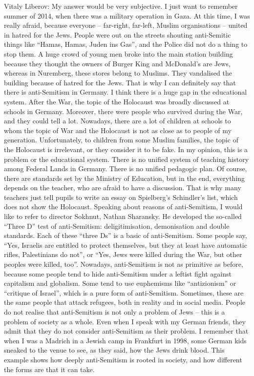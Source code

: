 Vitaly Liberov: My answer would be very subjective. I just want to remember summer of 2014, when there was a military operation in Gaza. At this time, I was really afraid, because everyone – far-right, far-left, Muslim organisations – united in hatred for the Jews. People were out on the streets shouting anti-Semitic things like “Hamas, Hamas, Juden ins Gas”, and the Police did not do a thing to stop them. A huge crowd of young men broke into the main station building because they thought the owners of Burger King and McDonald’s are Jews, whereas in Nuremberg, these stores belong to Muslims. They vandalised the building because of hatred for the Jews. That is why I can definitely say that there is anti-Semitism in Germany. I think there is a huge gap in the educational system. After the War, the topic of the Holocaust was broadly discussed at schools in Germany. Moreover, there were people who survived during the War, and they could tell a lot. Nowadays, there are a lot of children at schools to whom the topic of War and the Holocaust is not as close as to people of my generation. Unfortunately, to children from some Muslim families, the topic of the Holocaust is irrelevant, or they consider it to be fake. In my opinion, this is a problem or the educational system. There is no unified system of teaching history among Federal Lands in Germany. There is no unified pedagogic plan. Of course, there are standards set by the Ministry of Education, but in the end, everything depends on the teacher, who are afraid to have a discussion. That is why many teachers just tell pupils to write an essay on Spielberg’s Schindler’s list, which does not show the Holocaust. Speaking about reasons of anti-Semitism, I would like to refer to director Sokhnut, Nathan Sharansky. He developed the so-called “Three D” test of anti-Semitism: deligitimisation, demonisation and double standards. Each of these “three Ds” is a basic of anti-Semitism. Some people say, “Yes, Israelis are entitled to protect themselves, but they at least have automatic rifles, Palestinians do not”, or “Yes, Jews were killed during the War, but other peoples were killed, too”. Nowadays, anti-Semitism is not as primitive as before, because some people tend to hide anti-Semitism under a leftist fight against capitalism and globalism. Some tend to use euphemisms like “antizionism” or “critique of Israel”, which is a pure form of anti-Semitism. Sometimes, these are the same people that attack refugees, both in reality and in social media. People do not realise that anti-Semitism is not only a problem of Jews – this is a problem of society as a whole. Even when I speak with my German friends, they admit that they do not consider anti-Semitism as their problem. I remember that when I was a Madrich in a Jewish camp in Frankfurt in 1998, some German kids sneaked to the venue to see, as they said, how the Jews drink blood. This example shows how deeply anti-Semitism is rooted in society, and how different the forms are that it can take.  

